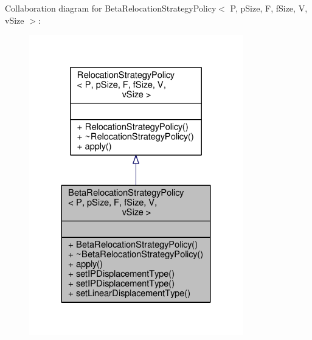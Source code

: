 Collaboration diagram for Beta\+Relocation\+Strategy\+Policy$<$ P, p\+Size, F, f\+Size, V, v\+Size $>$\+:\nopagebreak
\begin{figure}[H]
\begin{center}
\leavevmode
\includegraphics[width=263pt]{classBetaRelocationStrategyPolicy__coll__graph}
\end{center}
\end{figure}
